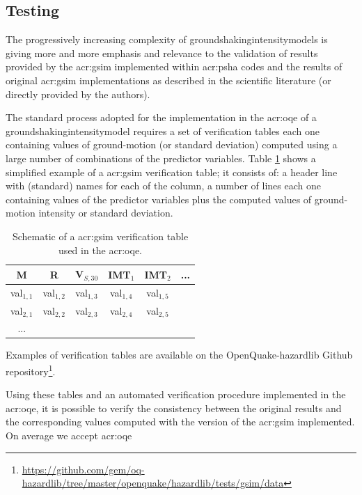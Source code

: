\subsection{Testing}
%
The progressively increasing complexity of 
\glspl{groundshakingintensitymodel}
is giving more and more emphasis and relevance to the validation 
of results provided by the \gls{acr:gsim} implemented within 
\gls{acr:psha} codes and the results of original \gls{acr:gsim} 
implementations as described in the scientific literature 
(or directly provided by the authors).

The standard process adopted for the implementation in the 
\gls{acr:oqe} of a \gls{groundshakingintensitymodel} requires a 
set of verification tables each one containing values of 
ground-motion (or standard deviation) computed using a large 
number of combinations of the predictor variables. 
%
Table \ref{tab:verification} shows a simplified example of a 
\gls{acr:gsim} verification table; it consists of: a header 
line with (standard) names for each of the column, a number
of lines each one containing values of the predictor variables
plus the computed values of ground-motion intensity or standard
deviation.
\begin{table}[!ht]
\centering
\caption{Schematic of a \gls{acr:gsim} verification table used in the 
\gls{acr:oqe}.}
\begin{tabular}{|cccccc|}
\hline
\rowcolor{anti-flashwhite}
M & R & V$_{S,30}$ & IMT$_1$ & IMT$_2$ & ... \\
\hline 
val$_{1,1}$ & val$_{1,2}$ & val$_{1,3}$ & val$_{1,4}$ & val$_{1,5}$ & \\
val$_{2,1}$ & val$_{2,2}$ & val$_{2,3}$ & val$_{2,4}$ & val$_{2,5}$ & \\
... & & & & & \\
\hline
\end{tabular}
\label{tab:verification}
\end{table}
Examples of verification tables are available on the OpenQuake-hazardlib Github
repository\footnote{
\href{https://github.com/gem/oq-hazardlib/tree/master/openquake/hazardlib/tests/gsim/data}{
https://github.com/gem/oq-hazardlib/tree/master/openquake/hazardlib/tests/gsim/data}
}.

Using these tables and an automated verification procedure implemented
in the \gls{acr:oqe}, it is possible to verify the consistency between 
the original results and the corresponding values computed with the 
version of the \gls{acr:gsim} implemented. 
%
On average we accept \gls{acr:oqe}

